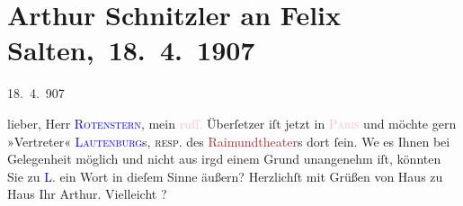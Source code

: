 

\renewcommand{\erwaehntePersonen}{Personen: Sigmund Lautenburg, Peter Rotenstern, Felix Salten, Felix Speidel}
\renewcommand{\erwaehnteInstitutionen}{Institutionen: Raimund-Theater}
\renewcommand{\erwaehnteOrte}{Orte: Paris, Russland, Wien}
\renewcommand{\erwaehnteWerke}{}
\section[ Arthur Schnitzler an Felix Salten, 18. 4. 1907]{Arthur Schnitzler an Felix Salten, 18. 4. 1907}
\nopagebreak{}
\rehead{ }\normalsize\beginnumbering{}
\toendnotes[C]{\smallbreak\pagebreak[2]}
\toendnotes[C]{\smallbreak}
\pstart
           \raggedleft{}{\pb}18. 4. 907\pend
           
\pstart{}lieber,\pend
\pstart
           Herr \textsc{\textcolor{blue}{Rotenstern}{}\ledrightnote{\textcolor{blue}{Peter Rotenstern}}}, mein \textcolor{pink}{ruſſ.}{}\ledrightnote{\textcolor{pink}{Russland}} Überſetzer iſt jetzt in \textsc{\textcolor{pink}{Paris}{}\ledrightnote{\textcolor{pink}{Paris}}} und möchte gern »Vertreter« \textsc{\textcolor{blue}{Lautenburg}{}\ledrightnote{\textcolor{blue}{Sigmund Lautenburg}}}s, \textsc{resp.} des \textcolor{brown}{Raimundtheater}{}\ledrightnote{\textcolor{brown}{Raimund-Theater}}s dort ſein. We{\geminationn} es Ihnen bei
               Gelegenheit möglich  und nicht aus irgd einem
               Grund unangenehm iſt, könnten Sie zu \textcolor{blue}{L.}{}\ledrightnote{\textcolor{blue}{Sigmund Lautenburg}} ein
               Wort in dieſem Sinne äußern?\pend
           \pstart Herzlichſt mit Grüßen von Haus zu Haus Ihr \spacefill\mbox{Arthur.}\pend{}
\pstart
           \noindent{}Vielleicht \label{K_L03008-1v}\label{K_L03008-1h}?\pend
           \endnumbering{}  
      